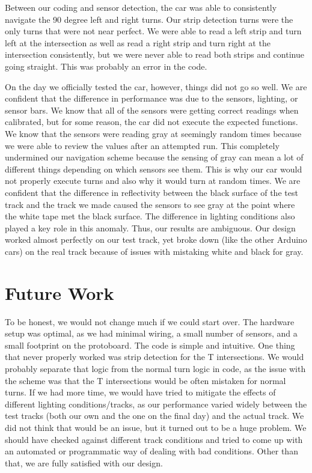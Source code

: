 \documentclass[12pt]{article}
\begin{document}
Between our coding and sensor detection, the car was able to consistently navigate the 90 degree left and right turns. Our strip detection turns were the only turns that were not near perfect. We were able to read a left strip and turn left at the intersection as well as read a right strip and turn right at the intersection consistently, but we were never able to read both strips and continue going straight. This was probably an error in the code.

On the day we officially tested the car, however, things did not go so well. We are confident that the difference in performance was due to the sensors, lighting, or sensor bars. We know that all of the sensors were getting correct readings when calibrated, but for some reason, the car did not execute the expected functions. We know that the sensors were reading gray at seemingly random times because we were able to review the values after an attempted run. This completely undermined our navigation scheme because the sensing of gray can mean a lot of different things depending on which sensors see them. This is why our car would not properly execute turns and also why it would turn at random times. We are confident that the difference in reflectivity between the black surface of the test track and the track we made caused the sensors to see gray at the point where the white tape met the black surface. The difference in lighting conditions also played a key role in this anomaly. Thus, our results are ambiguous. Our design worked almost
perfectly on our test track, yet broke down (like the other Arduino cars) on the
real track because of issues with mistaking white and black for gray.
\section{Future Work}
To be honest, we would not change much if we could start over. The hardware setup
was optimal, as we had minimal wiring, a small number of sensors, and a small
footprint on the protoboard. The code is simple and intuitive. One thing that
never properly worked was strip detection for the T intersections. We would
probably separate that logic from the normal turn logic in code, as the issue
with the scheme was that the T intersections would be often mistaken for normal
turns. If we had more time, we would have tried to mitigate the effects of
different lighting conditions/tracks, as our performance varied widely between
the test tracks (both our own and the one on the final day) and the actual track.
We did not think that would be an issue, but it turned out to be a huge problem.
We should have checked against different track conditions and tried to come up
with an automated or programmatic way of dealing with bad conditions. Other than
that, we are fully satisfied with our design.
\end{document}
